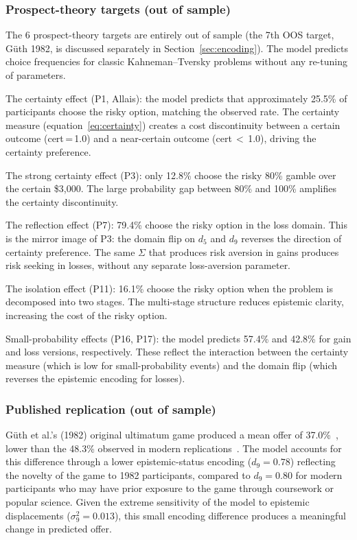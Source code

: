 \documentclass[journal]{IEEEtran}
\begin{document}
\subsubsection{Prospect-theory targets (out of sample)}

The 6 prospect-theory targets are entirely out of sample (the 7th OOS target, G\"{u}th 1982, is discussed separately in Section~\ref{sec:encoding}).
The model predicts choice frequencies for classic Kahneman--Tversky problems without any re-tuning of parameters.

The certainty effect (P1, Allais): the model predicts that approximately 25.5\% of participants choose the risky option, matching the observed rate.
The certainty measure (equation~\eqref{eq:certainty}) creates a cost discontinuity between a certain outcome (cert\,=\,1.0) and a near-certain outcome (cert\,$<$\,1.0), driving the certainty preference.

The strong certainty effect (P3): only 12.8\% choose the risky 80\% gamble over the certain \$3,000.
The large probability gap between 80\% and 100\% amplifies the certainty discontinuity.

The reflection effect (P7): 79.4\% choose the risky option in the loss domain.
This is the mirror image of P3: the domain flip on $d_5$ and $d_9$ reverses the direction of certainty preference.
The same $\Sigma$ that produces risk aversion in gains produces risk seeking in losses, without any separate loss-aversion parameter.

The isolation effect (P11): 16.1\% choose the risky option when the problem is decomposed into two stages.
The multi-stage structure reduces epistemic clarity, increasing the cost of the risky option.

Small-probability effects (P16, P17): the model predicts 57.4\% and 42.8\% for gain and loss versions, respectively.
These reflect the interaction between the certainty measure (which is low for small-probability events) and the domain flip (which reverses the epistemic encoding for losses).

\subsubsection{Published replication (out of sample)}

G\"uth et al.'s (1982) original ultimatum game produced a mean offer of 37.0\%~\cite{guth1982}, lower than the 48.3\% observed in modern replications~\cite{fraser2020}.
The model accounts for this difference through a lower epistemic-status encoding ($d_9 = 0.78$) reflecting the novelty of the game to 1982 participants, compared to $d_9 = 0.80$ for modern participants who may have prior exposure to the game through coursework or popular science.
Given the extreme sensitivity of the model to epistemic displacements ($\sigma_9^2 = 0.013$), this small encoding difference produces a meaningful change in predicted offer.
\end{document}
